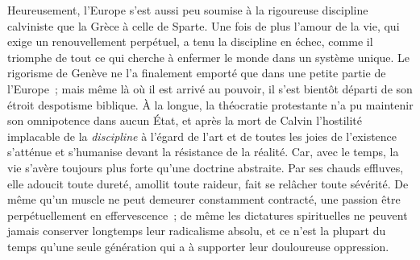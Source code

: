 \documentclass[french,twoside]{book} %
\begin{document}
Heureusement, l’Europe s’est aussi peu soumise à la rigoureuse discipline calviniste que la Grèce à celle de Sparte. Une fois de plus l’amour de la vie, qui exige un renouvellement perpétuel, a tenu la discipline en échec, comme il triomphe de tout ce qui cherche à enfermer le monde dans un système unique. Le rigorisme de Genève ne l’a finalement emporté que dans une petite partie de l’Europe ; mais même là où il est arrivé au pouvoir, il s’est bientôt départi de son étroit despotisme biblique. À la longue, la théocratie protestante n’a pu maintenir son omnipotence dans aucun État, et après la mort de Calvin l’hostilité implacable de la \emph{discipline} à l’égard de l’art et de toutes les joies de l’existence s’atténue et s’humanise devant la résistance de la réalité. Car, avec le temps, la vie s’avère toujours plus forte qu’une doctrine abstraite. Par ses chauds effluves, elle adoucit toute dureté, amollit toute raideur, fait se relâcher toute sévérité. De même qu’un muscle ne peut demeurer constamment contracté, une passion être perpétuellement en effervescence ; de même les dictatures spirituelles ne peuvent jamais conserver longtemps leur radicalisme absolu, et ce n’est la plupart du temps qu’une seule génération qui a à supporter leur douloureuse oppression.\par
\end{document}
